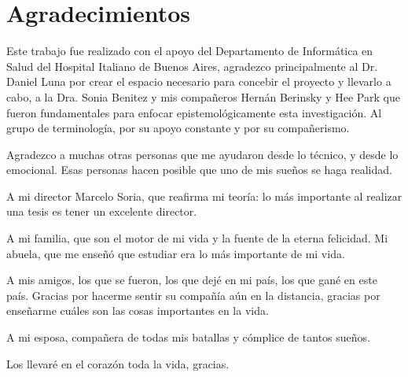 \chapter*{Agradecimientos}

\noindent Este trabajo fue realizado con el apoyo del Departamento de Informática en Salud del Hospital Italiano de Buenos Aires, agradezco principalmente al Dr. Daniel Luna por crear el espacio necesario para concebir el proyecto y llevarlo a cabo, a la Dra. Sonia Benitez y mis compañeros Hernán Berinsky y Hee Park que fueron fundamentales para enfocar epistemológicamente esta investigación. Al grupo de terminología, por su apoyo constante y por su compañerismo.

Agradezco a muchas otras personas que me ayudaron desde lo técnico, y desde lo emocional. Esas personas hacen posible que uno de mis sueños se haga realidad.

A mi director Marcelo Soria, que reafirma mi teoría: lo más importante al realizar una tesis es tener un excelente director.

A mi familia, que son el motor de mi vida y la fuente de la eterna felicidad. Mi abuela, que me enseñó que estudiar era lo más importante de mi vida.

A mis amigos, los que se fueron, los que dejé en mi país, los que gané en este país. Gracias por hacerme sentir su compañía aún en la distancia, gracias por enseñarme cuáles son las cosas importantes en la vida.

A mi esposa, compañera de todas mis batallas y cómplice de tantos sueños.

Los llevaré en el corazón toda la vida, gracias.